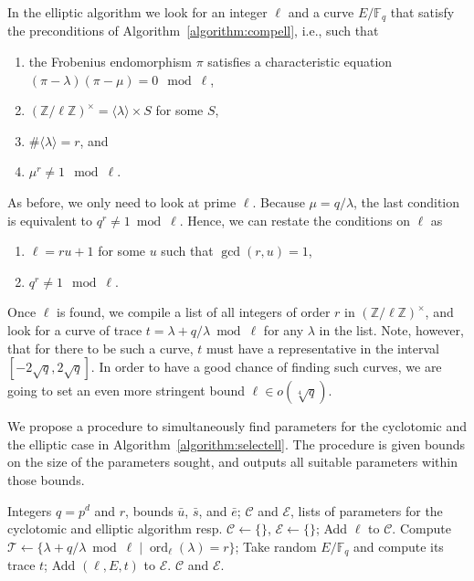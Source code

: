 \documentclass[12pt]{article}
\theoremstyle{plain}
\theoremstyle{definition}
\DeclareMathOperator{\order}{ord} %
\def\Z{\ensuremath{\mathbb{Z}}}
\def\F{\ensuremath{\mathbb{F}}}
\newcounter{algorithm}
\begin{document}
In the elliptic algorithm we look for an integer $\ell$ and a curve
$E/\F_q$ that satisfy the preconditions of
Algorithm~\ref{algorithm:compell}, i.e., such that 
\begin{enumerate}
\item the Frobenius endomorphism $\pi$ satisfies a characteristic
  equation $(\pi-\lambda)(\pi-\mu) = 0 \mod \ell$,
\item $(\Z/\ell\Z)^\times = \langle\lambda\rangle\times S$ for some $S$,
\item $\#\langle\lambda\rangle=r$, and
\item $\mu^r\ne1\mod\ell$.
\end{enumerate}

As before, we only need to look at prime $\ell$. Because
$\mu=q/\lambda$, the last condition is equivalent to
$q^r\ne1\bmod\ell$. Hence, we can restate the conditions on $\ell$ as
\begin{enumerate}
\item $\ell = ru+1$ for some $u$ such that $\gcd(r,u)=1$,
\item $q^r\ne1\mod\ell$.
\end{enumerate}
Once $\ell$ is found, we compile a list of all integers of order $r$
in $(\Z/\ell\Z)^\times$, and look for a curve of trace
$t=\lambda+q/\lambda\bmod\ell$ for any $\lambda$ in the list. Note,
however, that for there to be such a curve, $t$ must have a
representative in the interval $[-2\sqrt{q},2\sqrt{q}]$. In order to
have a good chance of finding such curves, we are going to set an even
more stringent bound $\ell\in o(\sqrt[4]{q})$.

We propose a procedure to simultaneously find parameters for the
cyclotomic and the elliptic case in
Algorithm~\ref{algorithm:selectell}. The procedure is given bounds on
the size of the parameters sought, and outputs all suitable parameters
within those bounds.

\begin{algorithm}
    \label{algorithm:selectell}
    \begin{algorithmic}[1]
      \REQUIRE Integers $q=p^d$ and $r$, bounds $\bar{u}$, $\bar{s}$, and $\bar{e}$;
      \ENSURE $\mathcal{C}$ and $\mathcal{E}$, lists of parameters for the cyclotomic and elliptic algorithm resp.
      \STATE $\mathcal{C}\leftarrow\{\}$, $\mathcal{E}\leftarrow\{\}$;
      \IF{\label{alg:selectell:order}$\order_\ell(q)=rs$ with $s\le\bar{s}$, and $\gcd(rs,u/s)=1$, and $\gcd(ur,d)=1$}
      \STATE Add $\ell$ to $\mathcal{C}$.
      \ENDIF
      \STATE\label{alg:selectell:ellorder} Compute $\mathcal{T} \leftarrow \{\lambda + q/\lambda \bmod\ell \;|\; \order_\ell(\lambda)=r\}$;
      \REPEAT\label{alg:selectell:ellloop}
      \STATE\label{alg:selectell:ellcount} Take random $E/\F_q$ and compute its trace $t$;
      \STATE Add $(\ell,E,t)$ to $\mathcal{E}$.
      \ENDIF
      \ENDIF
      \ENDFOR
      \RETURN $\mathcal{C}$ and $\mathcal{E}$.
    \end{algorithmic}
\end{algorithm}
\end{document}
